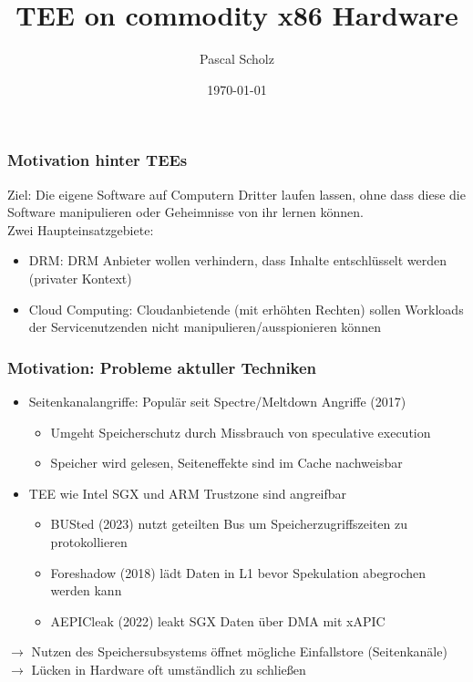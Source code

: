\documentclass{beamer}
\title{TEE on commodity x86 Hardware}
\author{Pascal Scholz}
\date{\today}
\begin{document}
\frame{\titlepage}

\begin{frame}
    \frametitle{Motivation hinter TEEs}
    Ziel: Die eigene Software auf Computern Dritter laufen lassen, ohne dass diese die Software manipulieren oder Geheimnisse von ihr lernen können. \\
    \bigskip
    Zwei Haupteinsatzgebiete:
    \begin{itemize}
        \item DRM: DRM Anbieter wollen verhindern, dass Inhalte entschlüsselt werden (privater Kontext)
        \item Cloud Computing: Cloudanbietende (mit erhöhten Rechten) sollen Workloads der Servicenutzenden nicht manipulieren/ausspionieren können
    \end{itemize}
\end{frame}

\begin{frame}
    \frametitle{Motivation: Probleme aktuller Techniken}
    \begin{itemize}
        \item Seitenkanalangriffe: Populär seit Spectre/Meltdown Angriffe (2017)
              \begin{itemize}
                  \item Umgeht Speicherschutz durch Missbrauch von speculative execution
                  \item Speicher wird gelesen, Seiteneffekte sind im Cache nachweisbar
              \end{itemize}
        \item TEE wie Intel SGX und ARM Trustzone sind angreifbar
              \begin{itemize}
                  \item BUSted (2023) nutzt geteilten Bus um Speicherzugriffszeiten zu protokollieren
                  \item Foreshadow (2018) lädt Daten in L1 bevor Spekulation abegrochen werden kann
                  \item AEPICleak (2022) leakt SGX Daten über DMA mit xAPIC
              \end{itemize}
    \end{itemize}
    $\rightarrow$ Nutzen des Speichersubsystems öffnet mögliche Einfallstore (Seitenkanäle)\\
    $\rightarrow$ Lücken in Hardware oft umständlich zu schließen
\end{frame}
\end{document}
